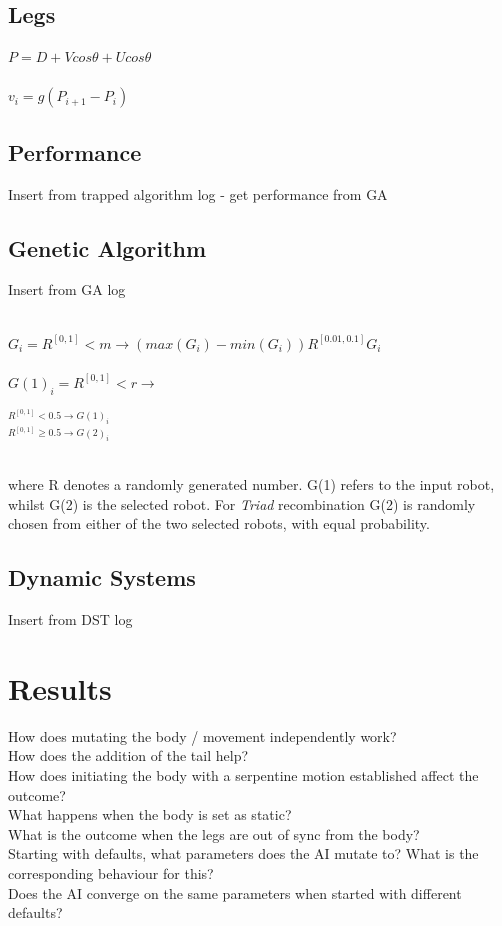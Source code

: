\documentclass{article}
\begin{document}
\subsection{Legs}
\begin{Large}
$P = D + Vcos\theta + Ucos\theta$\\\\
$v_{i} = g(P_{i + 1} - P_{i})$
\end{Large}
\subsection{Performance}
Insert from trapped algorithm log - get performance from GA
\subsection{Genetic Algorithm}
Insert from GA log\\
\begin{Large}\\
$G_{i} = R^{[0, 1]} < m \longrightarrow 
(max(G_{i}) - min(G_{i})) R^{[0.01, 0.1]}  G_{i}$\\\\
$G(1)_{i} = R^{[0, 1]} < r \longrightarrow$ 
\begin{LARGE}
$^{R^{[0, 1]} < 0.5\longrightarrow G(1)_{i}} 
_{R^{[0, 1]} \geq 0.5 \longrightarrow G(2)_{i}}$\\\\
\end{LARGE}

\end{Large}
where R denotes a randomly generated number. G(1) refers to the input robot, whilst G(2) is the selected robot. For \textit{Triad} recombination G(2) is randomly chosen from either of the two selected robots, with equal probability.
\subsection{Dynamic Systems}
Insert from DST log


\newpage
\section{Results}
How does mutating the body / movement independently work?\\
How does the addition of the tail help?\\
How does initiating the body with a serpentine motion established affect the outcome?\\
What happens when the body is set as static?\\
What is the outcome when the legs are out of sync from the body?\\
Starting with defaults, what parameters does the AI mutate to? What is the corresponding behaviour for this?\\
Does the AI converge on the same parameters when started with different defaults?\\
\end{document}
